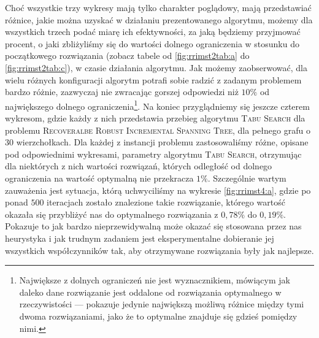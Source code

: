 Choć wszystkie trzy wykresy mają tylko charakter poglądowy, mają przedstawiać różnice, jakie można uzyskać w działaniu prezentowanego algorytmu, możemy dla wszystkich trzech podać miarę ich efektywności, za jaką będziemy przyjmować procent, o jaki zbliżyliśmy się do wartości dolnego ograniczenia w stosunku do początkowego rozwiązania (zobacz tabele od \ref{fig:rrimst2tab:a} do \ref{fig:rrimst2tab:c}), w czasie działania algorytmu. Jak możemy zaobserwować, dla wielu różnych konfiguracji algorytm potrafi sobie radzić z zadanym problemem bardzo różnie, zazwyczaj nie zwracając gorszej odpowiedzi niż $10\%$ od największego dolnego ograniczenia\footnote{Największe z dolnych ograniczeń nie jest wyznacznikiem, mówiącym jak daleko dane rozwiązanie jest oddalone od rozwiązania optymalnego w rzeczywistości --- pokazuje jedynie największą możliwą różnice między tymi dwoma rozwiązaniami, jako że to optymalne znajduje się gdzieś pomiędzy nimi.}. Na koniec przyglądniemy się jeszcze czterem wykresom, gdzie każdy z nich przedstawia przebieg algorytmu \textsc{Tabu Search} dla problemu \textsc{Recoveralbe Robust Incremental Spanning Tree}, dla pełnego grafu o $30$ wierzchołkach. Dla każdej z instancji problemu zastosowaliśmy różne, opisane pod odpowiednimi wykresami, parametry algorytmu \textsc{Tabu Search}, otrzymując dla niektórych z nich wartości rozwiązań, których odległość od dolnego ograniczenia na wartość optymalną nie przekracza $1\%$. Szczególnie wartym zauważenia jest sytuacja, którą uchwyciliśmy na wykresie \ref{fig:rrimst4:a}, gdzie po ponad $500$ iteracjach zostało znalezione takie rozwiązanie, którego wartość okazała się przybliżyć nas do optymalnego rozwiązania z $0,78\%$ do $0,19\%$. Pokazuje to jak bardzo nieprzewidywalną może okazać się stosowana przez nas heurystyka i jak trudnym zadaniem jest eksperymentalne dobieranie jej wszystkich współczynników tak, aby otrzymywane rozwiązania były jak najlepsze.

